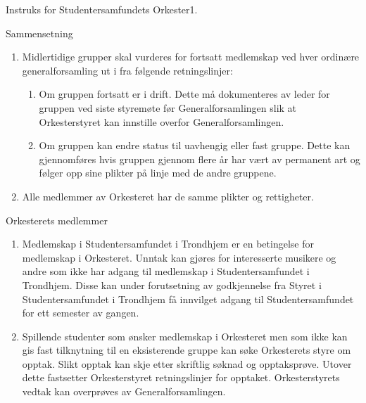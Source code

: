 \begin{instruks}{Instruks for Studentersamfundets Orkester}{1. }{ }
\begin{instruksledd}{Sammensetning}
\begin{enumerate}
        \item Midlertidige grupper skal vurderes for fortsatt medlemskap ved hver ordinære
generalforsamling ut i fra
følgende retningslinjer:
            \begin{enumerate}
                \item Om gruppen fortsatt er i drift. Dette må dokumenteres av leder for gruppen ved
siste styremøte før
Generalforsamlingen slik at Orkesterstyret kan innstille overfor Generalforsamlingen.
                \item Om gruppen kan endre status til uavhengig eller fast gruppe. Dette kan
gjennomføres hvis gruppen
gjennom flere år har vært av permanent art og følger opp sine plikter på linje med de andre
gruppene.
            \end{enumerate}
        \item Alle medlemmer av Orkesteret har de samme plikter og rettigheter.

    \end{enumerate}
\end{instruksledd}

\begin{instruksledd}{Orkesterets medlemmer}
    \begin{enumerate}
        \item Medlemskap i Studentersamfundet i Trondhjem er en betingelse for medlemskap i
Orkesteret. Unntak kan
gjøres for interesserte musikere og andre som ikke har adgang til medlemskap i Studentersamfundet i
Trondhjem. Disse kan under forutsetning av godkjennelse fra Styret i Studentersamfundet i Trondhjem
få
innvilget adgang til Studentersamfundet for ett semester av gangen.
        \item Spillende studenter som ønsker medlemskap i Orkesteret men som ikke kan gis fast
tilknytning til en
eksisterende gruppe kan søke Orkesterets styre om opptak. Slikt opptak kan skje etter skriftlig
søknad og
opptaksprøve. Utover dette fastsetter Orkesterstyret retningslinjer for opptaket. Orkesterstyrets
vedtak kan
overprøves av Generalforsamlingen.
    \end{enumerate}
\end{instruksledd}


\end{instruks}
